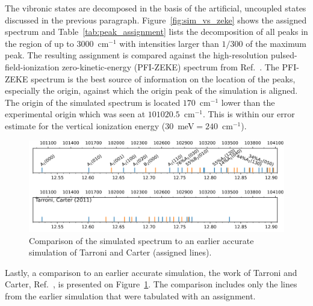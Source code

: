 \documentclass[
12pt,
a4paper,
prb,
superscriptaddress,
]{revtex4}
\begin{document}
The vibronic states are decomposed in the basis of the artificial, uncoupled
states discussed in the previous paragraph.  Figure~\ref{fig:sim_vs_zeke}
shows the assigned spectrum and Table~\ref{tab:peak_assignment} lists the
decomposition of all peaks in the region of up to $3000$~cm$^{-1}$ with
intensities larger than $1/300$ of the maximum peak. 
The resulting assignment is compared against the high-resolution
pulsed-field-ionization zero-kinetic-energy (PFI-ZEKE) spectrum from
Ref.~\cite{Willitsch:O3ZEKE:2005}. The PFI-ZEKE spectrum is the best source of
information on the location of the peaks, especially the origin, against which
the origin peak of the simulation is aligned. The origin of the simulated
spectrum is located $170$~cm$^{-1}$ lower than the experimental origin which
was seen at $101 020.5$~cm$^{-1}$.\cite{Willitsch:O3ZEKE:2005} This is within
our error estimate for the vertical ionization energy
($30$~meV$=240$~cm$^{-1}$).  

\begin{figure}
    \includegraphics[width=16 cm]{figures/sim_vs_TarroniCarter}
    \caption{
        Comparison of the simulated spectrum to an earlier accurate simulation
        of Tarroni and Carter (assigned lines).~\cite{tarroni:O3:2011}
    }
    \label{fig:sim_vs_tarronicarter}
\end{figure}

Lastly, a comparison to an earlier accurate simulation, the work of Tarroni
and Carter, Ref.~\cite{Willitsch:O3ZEKE:2005}, is presented on
Figure~\ref{fig:sim_vs_tarronicarter}. The comparison includes only the lines
from the earlier simulation that were tabulated with an assignment. 
\end{document}

